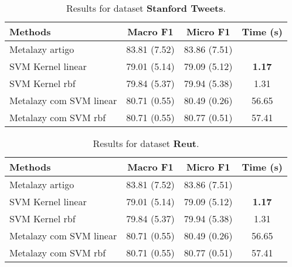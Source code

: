 \documentclass{article}
\begin{document}
	
	\begin{table}[t]
		\small
		\centering	
		\begin{tabular}{l c c c}	
			\toprule
			\textbf{Methods} & \textbf{Macro F1} & \textbf{Micro F1} & \textbf{Time (s)} \\
			\midrule    
			Metalazy artigo & 83.81 (7.52) & 83.86 (7.51) & \\
			SVM Kernel linear & 79.01 (5.14) & 79.09 (5.12) & \textbf{1.17}\\
			SVM Kernel rbf &  79.84 (5.37) & 79.94 (5.38) & 1.31\\
			Metalazy com SVM linear & 80.71 (0.55)  & 80.49 (0.26) & 56.65 \\	
			Metalazy com SVM rbf & 80.71 (0.55) & 80.77 (0.51) & 57.41\\	
			\bottomrule 
		\end{tabular}
		\caption{Results for dataset \textbf{Stanford Tweets}.}
		\label{tab:dataset_Stanford}
	\end{table}

		
	\begin{table}[t]
		\small
		\centering	
		\begin{tabular}{l c c c}	
			\toprule
			\textbf{Methods} & \textbf{Macro F1} & \textbf{Micro F1} & \textbf{Time (s)} \\
			\midrule    
			Metalazy artigo & 83.81 (7.52) & 83.86 (7.51) & \\
			SVM Kernel linear & 79.01 (5.14) & 79.09 (5.12) & \textbf{1.17}\\
			SVM Kernel rbf &  79.84 (5.37) & 79.94 (5.38) & 1.31\\
			Metalazy com SVM linear & 80.71 (0.55)  & 80.49 (0.26) & 56.65 \\	
			Metalazy com SVM rbf & 80.71 (0.55) & 80.77 (0.51) & 57.41\\	
			\bottomrule 
		\end{tabular}
		\caption{Results for dataset \textbf{Reut}.}
		\label{tab:dataset_reut}
	\end{table}
	
	
	



\begin{comment}
\begin{table}[t]
	\small
	\centering	
	\begin{tabular}{c c c}	
		\toprule
		\textbf{Methods} & & \textbf{STANFORD\_TWEETS}\\
		\midrule    
		\multirow{2}{*}{METALAZY}& macro F1  \\ &micro F1 \\	
		\bottomrule 
	\end{tabular}
	\caption{The cardinality of $P$ and $F$ for different cities.}
	\label{tab:dataset}
\end{table}
\end{comment}
\end{document}
